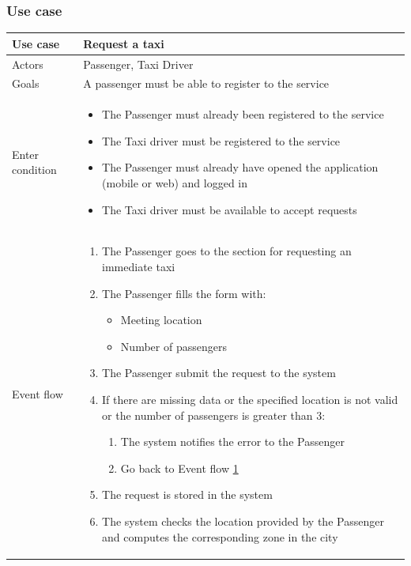 \subsubsection{Use case}
\begin{table}[H]
\centering
\begin{tabularx}{\textwidth}{|l|X|} \hline
Use case & \textbf{Request a taxi} \\ \hline 
Actors & Passenger, Taxi Driver \\ \hline
Goals & A passenger must be able to register to the service \\ \hline
Enter condition & \begin{itemize}
					\item The Passenger must already been registered to the service
					\item The Taxi driver must be registered to the service
					\item The Passenger must already have opened the application (mobile or web) and logged in
					\item The Taxi driver must be available to accept requests
					\end{itemize} \\ \hline
Event flow & \begin{enumerate}
				\item The Passenger goes to the section for requesting an immediate taxi
				\item \label{fillForm} The Passenger fills the form with:
				\begin{itemize}
					\item Meeting location
					\item Number of passengers
				\end{itemize}
				\item The Passenger submit the request to the system
				\item If there are missing data or the specified location is not valid or the number of passengers is greater than 3:
				\begin{enumerate}
					\item The system notifies the error to the Passenger
					\item Go back to Event flow \ref{fillForm}
				\end{enumerate}
				\item The request is stored in the system
				\item The system checks the location provided by the Passenger and computes the corresponding zone in the city

\end{enumerate}
\end{tabularx}
\end{table}
